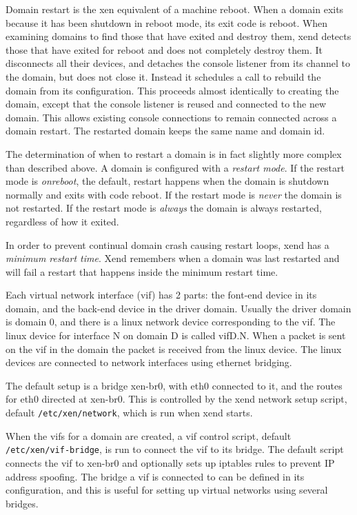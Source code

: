 \documentclass[11pt,twoside,final,openright]{report}
\begin{document}
Domain restart is the xen equivalent of a machine reboot. When a domain
exits because it has been shutdown in reboot mode, its exit code is reboot.
When examining domains to find those that have exited and destroy them,
xend detects those that have exited for reboot and does not completely destroy
them. It disconnects all their devices, and detaches the console listener
from its channel to the domain, but does not close it. Instead it schedules
a call to rebuild the domain from its configuration. This proceeds almost
identically to creating the domain, except that the console listener is
reused and connected to the new domain. This allows existing console
connections to remain connected across a domain restart. The restarted
domain keeps the same name and domain id.

The determination of when to restart a domain is in fact slightly more
complex than described above. A domain is configured with a 
{\em restart mode}. If the restart mode is {\em onreboot}, the default,
restart happens when the domain is shutdown normally and
exits with code reboot. If the restart mode is {\em never} the domain is
not restarted. If the restart mode is {\em always} the domain is always
restarted, regardless of how it exited.

In order to prevent continual domain crash causing restart loops, xend
has a {\em minimum restart time}. Xend remembers when a domain was last
restarted and will fail a restart that happens inside the minimum
restart time.

Each virtual network interface (vif) has 2 parts: the font-end device in its domain,
and the back-end device in the driver domain. Usually the driver domain is domain 0,
and there is a linux network device corresponding to the vif. The linux device for
interface N on domain D is called vifD.N. When a packet is sent on the vif in the 
domain the packet is received from the linux device. The linux devices are connected
to network interfaces using ethernet bridging.

The default setup is a bridge xen-br0, with eth0 connected to it, and the routes
for eth0 directed at xen-br0. This is controlled by the xend network setup script,
default {\tt /etc/xen/network}, which is run when xend starts.

When the vifs for a domain are created, a vif control script, default {\tt /etc/xen/vif-bridge},
is run to connect the vif to its bridge. The default script connects the vif
to xen-br0 and optionally sets up iptables rules to prevent IP address spoofing.
The bridge a vif is connected to can be defined in its configuration, and this is useful
for setting up virtual networks using several bridges.
\end{document}
